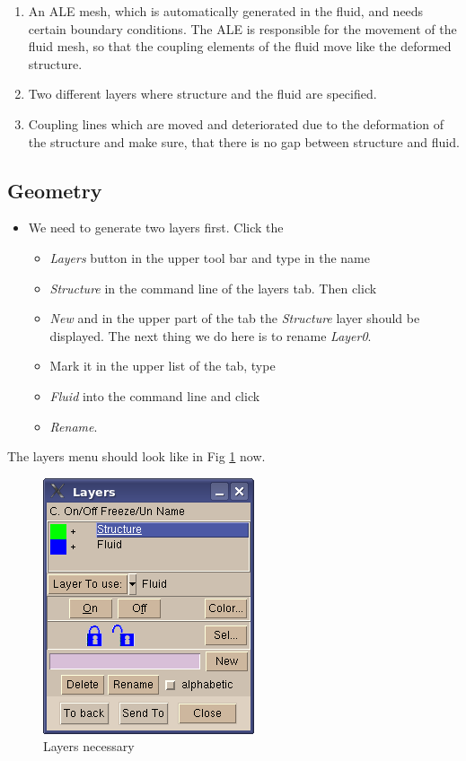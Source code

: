 \begin{enumerate}
\item An ALE mesh, which is automatically generated in the fluid, and needs
certain boundary conditions. The ALE is responsible for the movement
of the fluid mesh, so that the coupling elements of the fluid move
like the deformed structure.
\item Two different layers where structure and the fluid are specified.
\item Coupling lines which are moved and deteriorated due to the deformation
of the structure and make sure, that there is no gap between structure
and fluid.
\end{enumerate}

\subsection{Geometry}

\begin{itemize}
\item We need to generate two layers first. Click the 

\begin{itemize}
\item \emph{Layers} button in the upper tool bar and type in the name 
\item \emph{Structure} in the command line of the layers tab. Then click 
\item \emph{New} and in the upper part of the tab the \emph{Structure} layer
should be displayed. The next thing we do here is to rename \emph{Layer0}. 
\item Mark it in the upper list of the tab, type 
\item \emph{Fluid} into the command line and click 
\item \emph{Rename}.
\end{itemize}
\end{itemize}
The layers menu should look like in Fig \ref{tut_fsi:5.1} now.

%
\begin{figure}[h]
\includegraphics[scale=0.6]{Bilder/fsi_01}


\caption{\label{tut_fsi:5.1} Layers necessary}
\end{figure}


